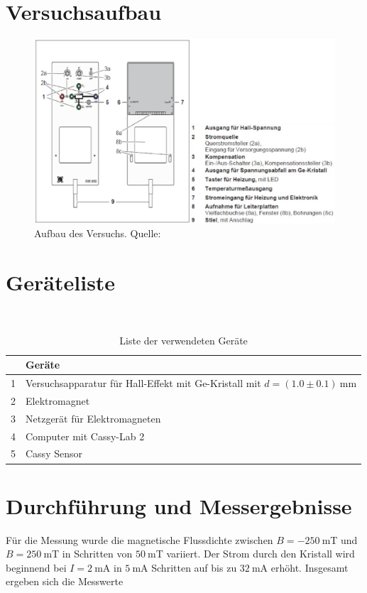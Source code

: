 \documentclass{article}
\begin{document}
\section{Versuchsaufbau}

\begin{figure}[H]
\includegraphics[scale=1.4]{versuch1.png}
\caption{Aufbau des Versuchs. Quelle: \cite{moodle}}
\end{figure}



\section{Geräteliste}


\begin{table}[H]
\caption{Liste der verwendeten Geräte}
~
\begin{tabular}{l|l}
 & Geräte  \\
\hline
1 & Versuchsapparatur für Hall-Effekt mit Ge-Kristall mit $d=(1.0\pm0.1)~$mm\\
2 & Elektromagnet \\
3 & Netzgerät für Elektromagneten \\
4 & Computer mit Cassy-Lab 2 \\
5 & Cassy Sensor
\end{tabular}

\end{table}

\newpage

\section{Durchführung und Messergebnisse}

Für die Messung wurde die magnetische Flussdichte zwischen $B=-250~$mT und $B=250~$mT in Schritten von $50~$mT variiert. Der Strom durch den Kristall wird beginnend bei $I=2~$mA in $5~$mA Schritten auf bis zu $32~$mA erhöht. Insgesamt ergeben sich die Messwerte
\end{document}
